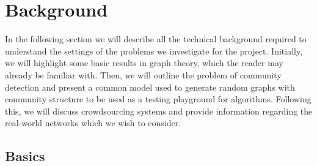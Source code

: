 \documentclass[12pt]{article}
\numberwithin{equation}{section}
\begin{document}
\newpage
\thispagestyle{plain}
\mbox{}
\section {Background}
\label{sec:background}

In the following section we will describe all the technical background required to understand the settings of the problems we investigate for the project. Initially, we will highlight some basic results in graph theory, which the reader may already be familiar with. Then, we will outline the problem of community detection and present a common model used to generate random graphs with community structure to be used as a testing playground for algorithms. Following this, we will discuss crowdsourcing systems and provide information regarding the real-world networks which we wish to consider.

\subsection{Basics}
\label{subsec:backgroundBasics}
\end{document}
